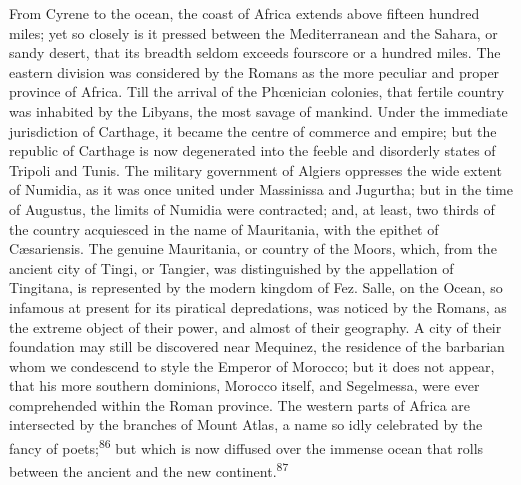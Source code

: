 From Cyrene to the ocean, the coast of Africa extends above
fifteen hundred miles; yet so closely is it pressed between the
Mediterranean and the Sahara, or sandy desert, that its breadth
seldom exceeds fourscore or a hundred miles. The eastern division
was considered by the Romans as the more peculiar and proper
province of Africa. Till the arrival of the Phœnician colonies,
that fertile country was inhabited by the Libyans, the most
savage of mankind. Under the immediate jurisdiction of Carthage,
it became the centre of commerce and empire; but the republic of
Carthage is now degenerated into the feeble and disorderly states
of Tripoli and Tunis. The military government of Algiers
oppresses the wide extent of Numidia, as it was once united under
Massinissa and Jugurtha; but in the time of Augustus, the limits
of Numidia were contracted; and, at least, two thirds of the
country acquiesced in the name of Mauritania, with the epithet of
Cæsariensis. The genuine Mauritania, or country of the Moors,
which, from the ancient city of Tingi, or Tangier, was
distinguished by the appellation of Tingitana, is represented by
the modern kingdom of Fez. Salle, on the Ocean, so infamous at
present for its piratical depredations, was noticed by the
Romans, as the extreme object of their power, and almost of their
geography. A city of their foundation may still be discovered
near Mequinez, the residence of the barbarian whom we condescend
to style the Emperor of Morocco; but it does not appear, that his
more southern dominions, Morocco itself, and Segelmessa, were
ever comprehended within the Roman province. The western parts of
Africa are intersected by the branches of Mount Atlas, a name so
idly celebrated by the fancy of poets;\textsuperscript{86} but which is now
diffused over the immense ocean that rolls between the ancient
and the new continent.\textsuperscript{87}



